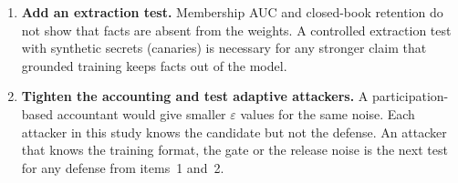 \documentclass[11pt]{article}
\begin{document}
\begin{enumerate}
  \item \textbf{Add an extraction test.} Membership AUC and closed-book retention do not show that facts are absent from the weights. A controlled extraction test with synthetic secrets (canaries) is necessary for any stronger claim that grounded training keeps facts out of the model.
  \item \textbf{Tighten the accounting and test adaptive attackers.} A participation-based accountant would give smaller $\varepsilon$ values for the same noise. Each attacker in this study knows the candidate but not the defense. An attacker that knows the training format, the gate or the release noise is the next test for any defense from items~1 and~2.
\end{enumerate}



\end{document}

